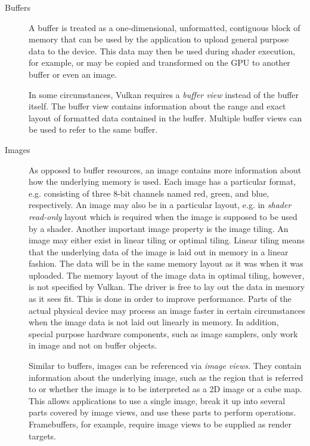     \begin{description}
      \item[Buffers]
        A buffer is treated as a one-dimensional, unformatted, contiguous block of memory that can be used by the \gls{application} to upload general purpose data to the device.
        This data may then be used during shader execution, for example, or may be copied and transformed on the GPU to another buffer or even an image.

        In some circumstances, Vulkan requires a \textit{buffer view} instead of the buffer itself.
        The buffer view contains information about the range and exact layout of formatted data contained in the buffer.
        Multiple buffer views can be used to refer to the same buffer.

      \item[Images]
        As opposed to buffer resources, an image contains more information about how the underlying memory is used.
        \proofread{}Each image has a particular format, e.g. consisting of three 8-bit channels named red, green, and blue, respectively.
        An image may also be in a particular layout, e.g. in \textit{shader read-only} layout which is required when the image is supposed to be used by a shader.
        Another important image property is the image tiling.
        An image may either exist in linear tiling or optimal tiling.
        Linear tiling means that the underlying data of the image is laid out in memory in a linear fashion.
        The data will be in the same memory layout as it was when it was uploaded.
        The memory layout of the image data in optimal tiling, however, is not specified by Vulkan.
        The \gls{driver} is free to lay out the data in memory as it sees fit.
        This is done in order to improve performance.
        Parts of the actual physical device may process an image faster in certain circumstances when the image data is not laid out linearly in memory.
        In addition, special purpose hardware components, such as image samplers, only work in image and not on buffer objects.

        Similar to buffers, images can be referenced via \textit{image views}.
        They contain information about the underlying image, such as the region that is referred to or whether the image is to be interpreted as a 2D image or a cube map.
        This allows applications to use a single image, break it up into several parts covered by image views, and use these parts to perform operations.
        Framebuffers, for example, require image views to be supplied as render targets.
    \end{description}


